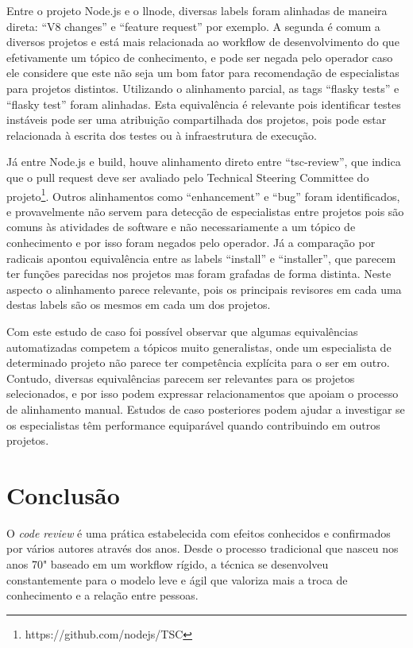 \documentclass[sigconf]{acmart}
\begin{document}
Entre o projeto Node.js e o llnode, diversas labels foram alinhadas de maneira direta: ``V8 changes'' e ``feature request'' por exemplo. A segunda é comum a diversos projetos e está mais relacionada ao workflow de desenvolvimento do que efetivamente um tópico de conhecimento, e pode ser negada pelo operador caso ele considere que este não seja um bom fator para recomendação de especialistas para projetos distintos. Utilizando o alinhamento parcial, as tags ``flasky tests'' e ``flasky test'' foram alinhadas. Esta equivalência é relevante pois identificar testes instáveis pode ser uma atribuição compartilhada dos projetos, pois pode estar relacionada à escrita dos testes ou à infraestrutura de execução.

Já entre Node.js e build, houve alinhamento direto entre ``tsc-review'', que indica que o pull request deve ser avaliado pelo Technical Steering Committee do projeto\footnote{https://github.com/nodejs/TSC}. Outros alinhamentos como ``enhancement'' e ``bug'' foram identificados, e provavelmente não servem para detecção de especialistas entre projetos pois são comuns às atividades de software e não necessariamente a um tópico de conhecimento e por isso foram negados pelo operador. Já a comparação por radicais apontou equivalência entre as labels ``install'' e ``installer'', que parecem ter funções parecidas nos projetos mas foram grafadas de forma distinta. Neste aspecto o alinhamento parece relevante, pois os principais revisores em cada uma destas labels são os mesmos em cada um dos projetos.

Com este estudo de caso foi possível observar que algumas equivalências automatizadas competem a tópicos muito generalistas, onde um especialista de determinado projeto não parece ter competência explícita para o ser em outro. Contudo, diversas equivalências parecem ser relevantes para os projetos selecionados, e por isso podem expressar relacionamentos que apoiam o processo de alinhamento manual. Estudos de caso posteriores podem ajudar a investigar se os especialistas têm performance equiparável quando contribuindo em outros projetos.

\section{Conclusão}\label{cha:conclusao}

O \textit{code review} é uma prática estabelecida com efeitos conhecidos e confirmados por vários autores através dos anos. Desde o processo tradicional que nasceu nos anos 70" baseado em um workflow rígido, a técnica se desenvolveu constantemente para o modelo leve e ágil que valoriza mais a troca de conhecimento e a relação entre pessoas.
\end{document}
